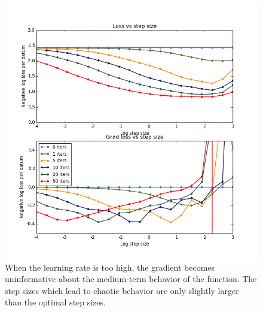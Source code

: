 \documentclass{article}
\begin{document}
\begin{figure}[ht]
\vskip 0.2in
\begin{center}
\centerline{\includegraphics[width=\columnwidth]{../experiments/Jan_14_learning_rate_wiggliness/1/fig.png}}
\caption{When the learning rate is too high, the gradient becomes uninformative about the medium-term behavior of the function.
The step sizes which lead to chaotic behavior are only slightly larger than the optimal step sizes.}
\label{fig:chaos}
\end{center}
\vskip -0.2in
\end{figure} 
\end{document}
